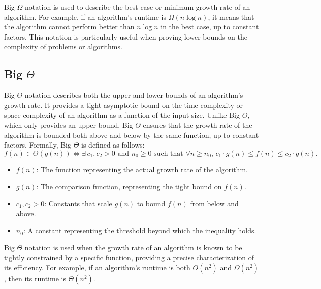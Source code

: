 Big $\Omega$ notation is used to describe the best-case or 
minimum growth rate of an algorithm. For example, if an 
algorithm's runtime is $\Omega(n \log n)$, it means that the 
algorithm cannot perform better than $n \log n$ in the best case, 
up to constant factors. This notation is particularly useful 
when proving lower bounds on the complexity of problems or algorithms.

\subsection{Big $\Theta$}
Big $\Theta$ notation describes both the upper and lower bounds 
of an algorithm's growth rate. It provides a tight asymptotic 
bound on the time complexity or space complexity of an algorithm 
as a function of the input size. Unlike Big $O$, which only provides 
an upper bound, Big $\Theta$ ensures that the growth rate of the 
algorithm is bounded both above and below by the same function, 
up to constant factors. Formally, Big $\Theta$ is defined as follows:
\[
f(n) \in \Theta(g(n)) \iff \exists \, c_1, c_2 > 0 \text{ and } n_0 \geq 0 \text{ such that } \forall n \geq n_0, \, c_1 \cdot g(n) \leq f(n) \leq c_2 \cdot g(n).
\]
\begin{itemize}
    \item $f(n)$: The function representing the actual growth rate of the algorithm.
    \item $g(n)$: The comparison function, representing the tight bound on $f(n)$.
    \item $c_1, c_2 > 0$: Constants that scale $g(n)$ to bound $f(n)$ from below and above.
    \item $n_0$: A constant representing the threshold beyond which the inequality holds.
\end{itemize}

Big $\Theta$ notation is used when the growth rate of an algorithm 
is known to be tightly constrained by a specific function, providing 
a precise characterization of its efficiency. For example, if an 
algorithm's runtime is both $O(n^2)$ and $\Omega(n^2)$, then its 
runtime is $\Theta(n^2)$.